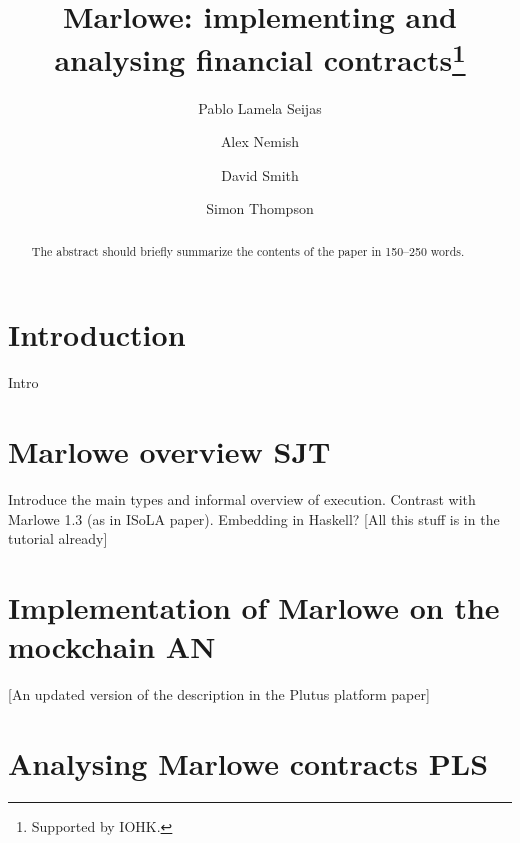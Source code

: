 \documentclass[runningheads]{llncs}
\begin{document}
%
\title{Marlowe: implementing and analysing financial contracts\thanks{Supported by IOHK.}}
%
%
\author{
Pablo Lamela Seijas \and
Alex Nemish \and
David Smith \and
Simon Thompson}
%

%
%
\maketitle              %
%



\begin{abstract}
The abstract should briefly summarize the contents of the paper in
150--250 words.

\end{abstract}
%
%
%


\section{Introduction}

Intro
\section{Marlowe overview SJT}

Introduce the main types and informal overview of execution. Contrast with Marlowe 1.3 (as in ISoLA paper). Embedding in Haskell? [All this stuff is in the tutorial already]

\section{Implementation of Marlowe on the mockchain AN}

 [An updated version of the description in the Plutus platform paper]

\section{Analysing Marlowe contracts PLS}
\end{document}
